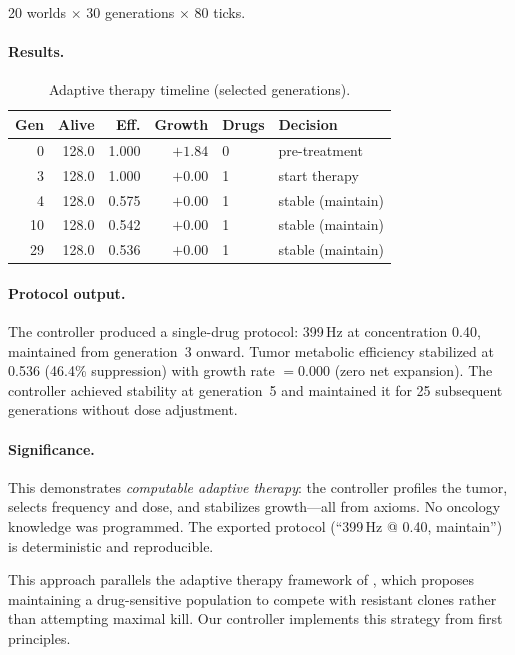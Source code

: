 \documentclass[11pt,a4paper]{article}
\begin{document}
20 worlds $\times$ 30 generations $\times$ 80 ticks.

\paragraph{Results.}

\begin{table}[h]
\centering
\caption{Adaptive therapy timeline (selected generations).}
\label{tab:adaptive-results}
\small
\begin{tabular}{@{}rrrrll@{}}
\toprule
\textbf{Gen} & \textbf{Alive} & \textbf{Eff.} & \textbf{Growth} & \textbf{Drugs} & \textbf{Decision} \\
\midrule
0  & 128.0 & 1.000 & $+1.84$ & 0 & pre-treatment \\
3  & 128.0 & 1.000 & $+0.00$ & 1 & start therapy \\
4  & 128.0 & 0.575 & $+0.00$ & 1 & stable (maintain) \\
10 & 128.0 & 0.542 & $+0.00$ & 1 & stable (maintain) \\
29 & 128.0 & 0.536 & $+0.00$ & 1 & stable (maintain) \\
\bottomrule
\end{tabular}
\end{table}

\paragraph{Protocol output.}
The controller produced a single-drug protocol:
399\,Hz at concentration 0.40, maintained from generation~3
onward. Tumor metabolic efficiency stabilized at 0.536
(46.4\% suppression) with growth rate $= 0.000$ (zero net
expansion). The controller achieved stability at generation~5
and maintained it for 25 subsequent generations without dose
adjustment.

\paragraph{Significance.}
This demonstrates \emph{computable adaptive therapy}: the
controller profiles the tumor, selects frequency and dose,
and stabilizes growth---all from axioms. No oncology
knowledge was programmed. The exported protocol
(``399\,Hz @ 0.40, maintain'') is deterministic and
reproducible.

This approach parallels the adaptive therapy framework of
\citet{gatenby2009adaptive}, which proposes maintaining a
drug-sensitive population to compete with resistant clones
rather than attempting maximal kill. Our controller
implements this strategy from first principles.
\end{document}
